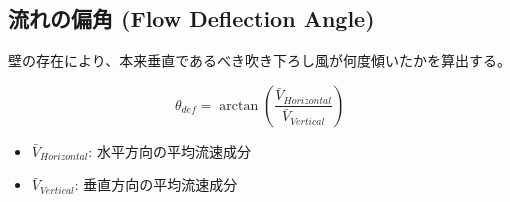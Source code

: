 \documentclass[a4paper,11pt]{jsarticle} %
\begin{document}
\subsection{流れの偏角 (Flow Deflection Angle)}
壁の存在により、本来垂直であるべき吹き下ろし風が何度傾いたかを算出する。

\begin{equation}
  \theta_{def} = \arctan \left( \frac{\bar{V}_{Horizontal}}{\bar{V}_{Vertical}} \right)
\end{equation}

\begin{itemize}
  \item $\bar{V}_{Horizontal}$: 水平方向の平均流速成分
  \item $\bar{V}_{Vertical}$: 垂直方向の平均流速成分
\end{itemize}
\end{document}
